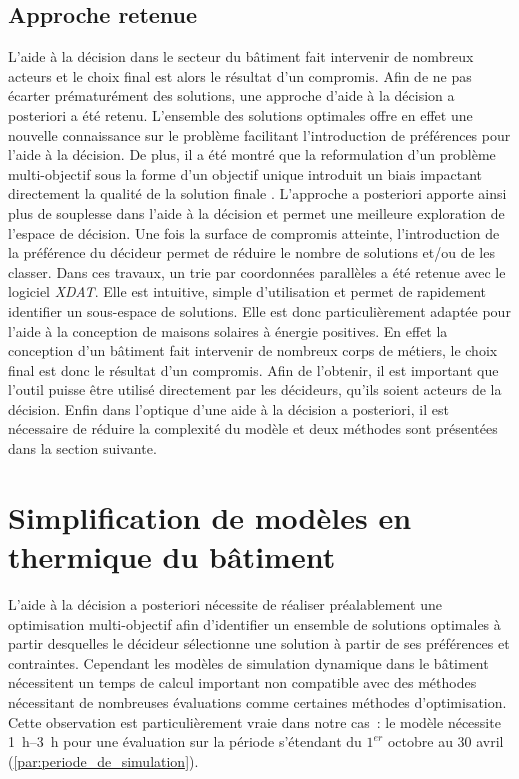 \subsection{Approche retenue} %
\label{sub:approche_retenue}
L’aide à la décision dans le secteur du bâtiment fait intervenir de nombreux acteurs et le
choix final est alors le résultat d’un compromis. Afin de ne pas écarter prématurément des
solutions, une approche d’aide à la décision a posteriori a été retenu. L’ensemble des
solutions optimales offre en effet une nouvelle connaissance sur le problème facilitant
l’introduction de préférences pour l’aide à la décision. De plus, il a été montré que la
reformulation d’un problème multi-objectif sous la forme d’un objectif unique introduit un
biais impactant directement la qualité de la solution finale \parencite{Blondeau2002165}.
L’approche a posteriori apporte ainsi plus de souplesse dans l’aide à la décision et
permet une meilleure exploration de l’espace de décision.
Une fois la surface de compromis atteinte, l’introduction de la préférence du décideur
permet de réduire le nombre de solutions et/ou de les classer. Dans ces travaux, un trie
par coordonnées parallèles a été retenue avec le logiciel \textit{XDAT}. Elle est intuitive,
simple d’utilisation et permet de rapidement identifier un sous-espace de solutions.
Elle est donc particulièrement adaptée pour l’aide à la conception de maisons solaires
à énergie positives. En effet la conception d’un bâtiment fait intervenir de nombreux
corps de métiers, le choix final est donc le résultat d’un compromis. Afin de l’obtenir,
il est important que l’outil puisse être utilisé directement par les décideurs, qu’ils
soient acteurs de la décision.
Enfin dans l’optique d’une aide à la décision a posteriori, il est nécessaire de réduire la
complexité du modèle et deux méthodes sont présentées dans la section suivante.




\section{Simplification de modèles en thermique du bâtiment} %
\label{sec:simplification_de_modeles_en_thermique_du_batiment}
L’aide à la décision a posteriori nécessite de réaliser préalablement une optimisation
multi-objectif afin d’identifier un ensemble de solutions optimales à partir desquelles le
décideur sélectionne une solution à partir de ses préférences et contraintes.
Cependant les modèles de simulation dynamique dans le bâtiment nécessitent un temps de calcul
important non compatible avec des méthodes nécessitant de nombreuses évaluations comme
certaines méthodes d’optimisation. Cette observation est particulièrement vraie dans notre
cas~: le modèle nécessite \SIrange{1}{3}{\hour} pour une évaluation sur la période s’étendant
du $1^{er}$ octobre au $30$ avril (\ref{par:periode_de_simulation}).

